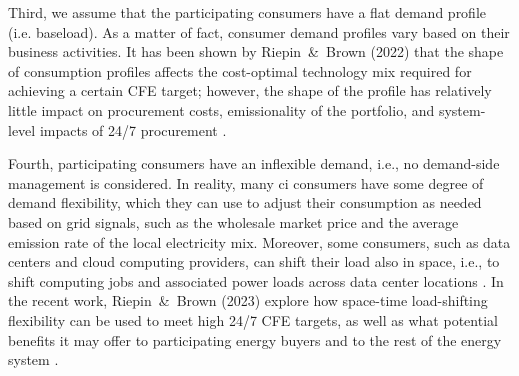 Third, we assume that the participating consumers have a flat demand profile (i.e. baseload).
As a matter of fact, consumer demand profiles vary based on their business activities.
It has been shown by Riepin~\&~Brown (2022) that the shape of consumption profiles affects the cost-optimal technology mix required for achieving a certain CFE target; however, the shape of the profile has relatively little impact on procurement costs, emissionality of the portfolio, and system-level impacts of 24/7 procurement \cite{riepin-zenodo-systemlevel247}.

Fourth, participating consumers have an inflexible demand, i.e., no demand-side management is considered.
In reality, many \gls{ci} consumers have some degree of demand flexibility, which they can use to adjust their consumption as needed based on grid signals, such as the wholesale market price and the average emission rate of the local electricity mix.
Moreover, some consumers, such as data centers and cloud computing providers, can shift their load also in space, i.e., to shift computing
jobs and associated power loads across data center locations \cite{rosskoningsteinWeNowMore2021}.
In the recent work, Riepin~\&~Brown (2023) explore how space-time load-shifting flexibility can be used to meet high 24/7 CFE targets, as well as what potential benefits it may offer to participating energy buyers and to the rest of the energy system \cite{riepin-zenodo-spacetime247CFE}.

